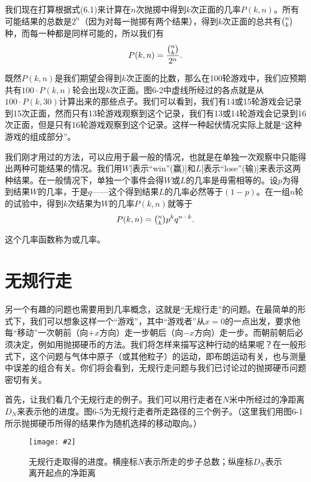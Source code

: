 \documentclass[12pt,oneside]{book}
\newenvironment{linefig}[2][1]
{\begin{figure}[H]
\centering
\texttt{[image: \#2]}}
{\end{figure}}
\begin{document}
我们现在打算根据式(6.1)来计算在$n$次抛掷中得到$k$次正面的几率$P(k,n)$。所有可能结果的总数是$2^n$（因为对每一抛掷有两个结果），得到$k$次正面的总共有$\tbinom{n}{k}$种，而每一种都是同样可能的，所以我们有
\begin{equation}
\label{Eq:I:6:5}
P(k,n)=\frac{\tbinom{n}{k}}{2^n}.
\end{equation}

既然$P(k,n)$是我们期望会得到$k$次正面的比数，那么在100轮游戏中，我们应预期共有$100\cdot P(k,n)$轮会出现$k$次正面。图6-2中虚线所经过的各点就是从$100 \cdot P(k,30)$计算出来的那些点子。我们可以看到，我们有14或15轮游戏会记录到15次正面，然而只有13轮游戏观察到这个记录，我们有13或14轮游戏会记录到16次正面，但是只有16轮游戏观察到这个记录。这样一种起伏情况实际上就是“这种游戏的组成部分”。

我们刚才用过的方法，可以应用于最一般的情况，也就是在单独一次观察中只能得出两种可能结果的情况。我们用$W$[表示“win”(赢)]和$L$[表示“lose”(输)]来表示这两种结果。在一般情况下，单独一个事件会得$W$或$L$的几率是毋需相等的。设$p$为得到结果$W$的几率，于是$q$——这个得到结果$L$的几率必然等于$(1-p)$。在一组$n$轮的试验中，得到$k$次结果为$W$的几率$P(k,n)$就等于
\begin{equation}
\label{Eq:I:6:6}
P(k,n)=\tbinom{n}{k}p^kq^{n-k}.
\end{equation}

这个几率函数称为或几率。


\section{无规行走}
另一个有趣的问题也需要用到几率概念，这就是“无规行走”的问题。在最简单的形式下，我们可以想象这样一个“游戏”，其中“游戏者”从$x=0$的一点出发，要求他每“移动”一次朝前（向$+x$方向）走一步朝后（向$-x$方向）走一步。而朝前朝后必须决定，例如用抛掷硬币的方法。我们将怎样来描写这种行动的结果呢？在一般形式下，这个问题与气体中原子（或其他粒子）的运动，即布朗运动有关，也与测量中误差的组合有关。你们将会看到，无规行走问题与我们已讨论过的抛掷硬币问题密切有关。

首先，让我们看几个无规行走的例子。我们可以用行走者在$N$米中所经过的净距离$D_N$来表示他的进度。图6-5为无规行走者所走路径的三个例子。（这里我们用图6-1所示抛掷硬币所得的结果作为随机选择的移动取向。）


\begin{linefig}{无规行走取得的进度}
\caption{\footnotesize 无规行走取得的进度。横座标$N$表示所走的步子总数；纵座标$D_N$表示离开起点的净距离}
\label{fig:无规行走取得的进度}
\end{linefig}
\end{document}
